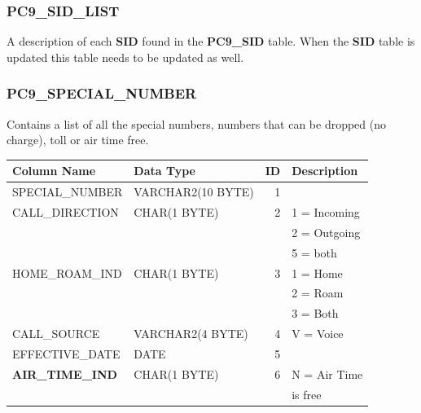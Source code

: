 \documentclass[12pt,twoside]{article}
\begin{document}
\normalsize
\subsubsection{PC9\_SID\_LIST}
\label{sec-9-14-2}

   A description of each \textbf{SID} found in the \textbf{PC9\_SID} table. When the
   \textbf{SID} table is updated this table needs to be updated as well. 
\subsubsection{PC9\_SPECIAL\_NUMBER}
\label{sec-9-14-3}

   Contains a list of all the special numbers, numbers that can be
   dropped (no charge), toll or air time free.
\scriptsize

\begin{center}
\begin{tabular}{llrl}
\hline
 \textbf{Column Name}          &  \textbf{Data Type}  &  \textbf{ID}  &  \textbf{Description}  \\
\hline
 SPECIAL\_NUMBER               &  VARCHAR2(10 BYTE)   &            1  &                        \\
 CALL\_DIRECTION               &  CHAR(1 BYTE)        &            2  &  1 = Incoming          \\
                               &                      &               &  2 = Outgoing          \\
                               &                      &               &  5 = both              \\
 HOME\_ROAM\_IND               &  CHAR(1 BYTE)        &            3  &  1 = Home              \\
                               &                      &               &  2 = Roam              \\
                               &                      &               &  3 = Both              \\
 CALL\_SOURCE                  &  VARCHAR2(4 BYTE)    &            4  &  V = Voice             \\
 EFFECTIVE\_DATE               &  DATE                &            5  &                        \\
 \textbf{AIR\_TIME\_IND}       &  CHAR(1 BYTE)        &            6  &  N = Air Time          \\
                               &                      &               &  is free               \\

\end{tabular}
\end{center}
\end{document}
